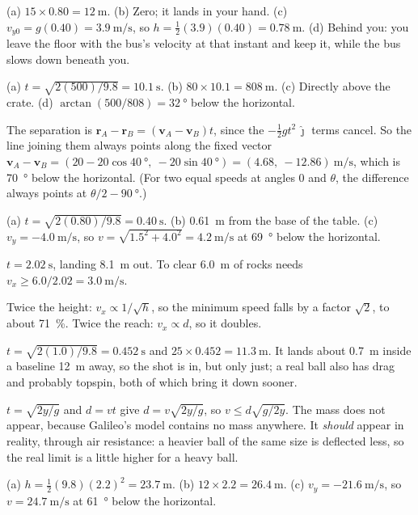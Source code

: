 \documentclass[11pt,twoside,openany]{book}
\begin{document}
\begin{description}[leftmargin=2.6em,itemsep=3pt,style=sameline]
  \item[3.10] (a) $15 \times 0.80 = \SI{12}{\metre}$. (b) Zero; it lands in your hand. (c) $v_{y0} = g(0.40) = \SI{3.9}{\metre\per\second}$, so $h = \tfrac12(3.9)(0.40) = \SI{0.78}{\metre}$. (d) Behind you: you leave the floor with the bus's velocity at that instant and keep it, while the bus slows down beneath you.
  \item[3.11] (a) $t = \sqrt{2(500)/9.8} = \SI{10.1}{\second}$. (b) $80 \times 10.1 = \SI{808}{\metre}$. (c) Directly above the crate. (d) $\arctan(500/808) = \SI{32}{\degree}$ below the horizontal.
  \item[3.13] The separation is $\mathbf{r}_A - \mathbf{r}_B = (\mathbf{v}_A - \mathbf{v}_B)t$, since the $-\tfrac12 gt^2\,\hat{\mathbf{\jmath}}$ terms cancel. So the line joining them always points along the fixed vector $\mathbf{v}_A - \mathbf{v}_B = (20 - 20\cos\SI{40}{\degree},\ -20\sin\SI{40}{\degree}) = (4.68,\ -12.86)\ \si{\metre\per\second}$, which is \SI{70}{\degree} below the horizontal. (For two equal speeds at angles $0$ and $\theta$, the difference always points at $\theta/2 - \SI{90}{\degree}$.)
  \item[3.14] (a) $t = \sqrt{2(0.80)/9.8} = \SI{0.40}{\second}$. (b) \SI{0.61}{\metre} from the base of the table. (c) $v_y = \SI{-4.0}{\metre\per\second}$, so $v = \sqrt{1.5^2+4.0^2} = \SI{4.2}{\metre\per\second}$ at \SI{69}{\degree} below the horizontal.
  \item[3.15] $t = \SI{2.02}{\second}$, landing \SI{8.1}{\metre} out. To clear \SI{6.0}{\metre} of rocks needs $v_x \ge 6.0/2.02 = \SI{3.0}{\metre\per\second}$.
  \item[3.16] Twice the height: $v_x \propto 1/\sqrt h$, so the minimum speed falls by a factor $\sqrt2$, to about \SI{71}{\percent}. Twice the reach: $v_x \propto d$, so it doubles.
  \item[3.17] $t = \sqrt{2(1.0)/9.8} = \SI{0.452}{\second}$ and $25 \times 0.452 = \SI{11.3}{\metre}$. It lands about \SI{0.7}{\metre} inside a baseline \SI{12}{\metre} away, so the shot is in, but only just; a real ball also has drag and probably topspin, both of which bring it down sooner.
  \item[3.18] $t = \sqrt{2y/g}$ and $d = vt$ give $d = v\sqrt{2y/g}$, so $v \le d\sqrt{g/2y}$. The mass does not appear, because Galileo's model contains no mass anywhere. It \emph{should} appear in reality, through air resistance: a heavier ball of the same size is deflected less, so the real limit is a little higher for a heavy ball.
  \item[3.19] (a) $h = \tfrac12(9.8)(2.2)^2 = \SI{23.7}{\metre}$. (b) $12 \times 2.2 = \SI{26.4}{\metre}$. (c) $v_y = \SI{-21.6}{\metre\per\second}$, so $v = \SI{24.7}{\metre\per\second}$ at \SI{61}{\degree} below the horizontal.

\end{description}
\end{document}

